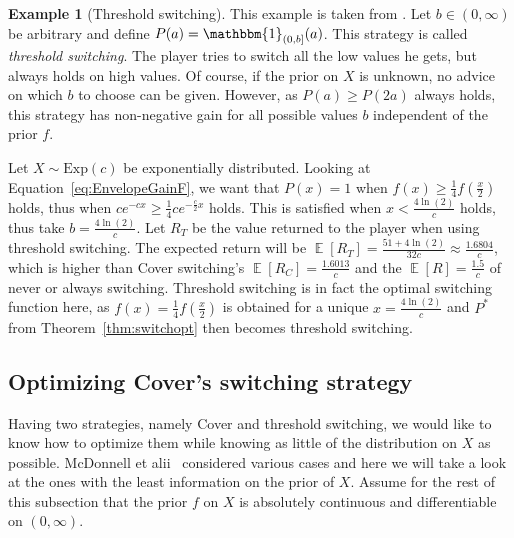 \documentclass[a4paper]{report}
\theoremstyle{plain}
\theoremstyle{definition}
\newtheorem{example}[theorem]{Example}
\theoremstyle{remark}
\numberwithin{equation}{chapter}
\DeclareMathOperator{\E}{\mathbb{E}}
\DeclareMathOperator{\1}{\mathbbm{1}}
\begin{document}
\begin{example}[Threshold switching]
This example is taken from \cite{McDonnell09}. Let $b\in(0,\infty)$ be arbitrary and define $P(a)=\1_{(0,b]}(a)$. This strategy is called \emph{threshold switching}. The player tries to switch all the low values he gets, but always holds on high values. Of course, if the prior on $X$ is unknown, no advice on which $b$ to choose can be given. However, as $P(a)\geq P(2a)$ always holds, this strategy has non-negative gain for all possible values $b$ independent of the prior $f$.

Let $X\sim\text{Exp}(c)$ be exponentially distributed. Looking at Equation~\ref{eq:EnvelopeGainF}, we want that $P(x)=1$ when $f(x)\geq\frac{1}{4}f\left(\frac{x}{2}\right)$ holds, thus when $ce^{-cx}\geq\frac{1}{4}ce^{-\frac{c}{2}x}$ holds. This is satisfied when $x<\frac{4\ln(2)}{c}$ holds, thus take $b=\frac{4\ln(2)}{c}$. Let $R_T$ be the value returned to the player when using threshold switching. The expected return will be $\E[R_T]=\frac{51+4\ln(2)}{32c}\approx\frac{1.6804}{c}$, which is higher than Cover switching's $\E[R_C]=\frac{1.6013}{c}$ and the $\E[R]=\frac{1.5}{c}$ of never or always switching. Threshold switching is in fact the optimal switching function here, as $f(x)=\frac{1}{4}f\left(\frac{x}{2}\right)$ is obtained for a unique $x=\frac{4\ln(2)}{c}$ and $P^*$ from Theorem~\ref{thm:switchopt} then becomes threshold switching.
\end{example}
\subsection{Optimizing Cover's switching strategy}
Having two strategies, namely Cover and threshold switching, we would like to know how to optimize them while knowing as little of the distribution on $X$ as possible. McDonnell et alii~\cite{McDonnell11} considered various cases and here we will take a look at the ones with the least information on the prior of $X$. Assume for the rest of this subsection that the prior $f$ on $X$ is absolutely continuous and differentiable on $(0,\infty)$.
\end{document}
